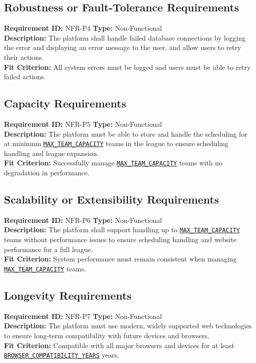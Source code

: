 \documentclass[12pt, titlepage]{article}
\begin{document}
\subsection{Robustness or Fault-Tolerance Requirements}
\textbf{Requirement ID:} NFR-P4 \quad \textbf{Type:} Non-Functional \\
\textbf{Description:} The platform shall handle failed database connections by logging the error and displaying an error message to the user, and allow users to retry their actions.\\
\textbf{Fit Criterion:} All system errors must be logged and users must be able to retry failed actions.

\subsection{Capacity Requirements}
\textbf{Requirement ID:} NFR-P5 \quad \textbf{Type:} Non-Functional \\
\textbf{Description:} The platform must be able to store and handle the scheduling for at minimum \hyperref[MAX_TEAM_CAPACITY]{\texttt{MAX\_TEAM\_CAPACITY}} teams in the league to ensure scheduling handling and league expansion.\\
\textbf{Fit Criterion:} Successfully manage \hyperref[MAX_TEAM_CAPACITY]{\texttt{MAX\_TEAM\_CAPACITY}} teams with no degradation in performance.

\subsection{Scalability or Extensibility Requirements}
\textbf{Requirement ID:} NFR-P6 \quad \textbf{Type:} Non-Functional \\
\textbf{Description:} The platform shall support handling up to \hyperref[MAX_TEAM_CAPACITY]{\texttt{MAX\_TEAM\_CAPACITY}} teams without performance issues to ensure scheduling handling and website performance for a full league.\\
\textbf{Fit Criterion:} System performance must remain consistent when managing \hyperref[MAX_TEAM_CAPACITY]{\texttt{MAX\_TEAM\_CAPACITY}} teams.

\subsection{Longevity Requirements}
\textbf{Requirement ID:} NFR-P7 \quad \textbf{Type:} Non-Functional \\
\textbf{Description:} The platform must use modern, widely supported web technologies to ensure long-term compatibility with future devices and browsers.\\
\textbf{Fit Criterion:} Compatible with all major browsers and devices for at least \hyperref[BROWSER_COMPATIBILITY_YEARS]{\texttt{BROWSER\_COMPATIBILITY\_YEARS}} years.
\end{document}
